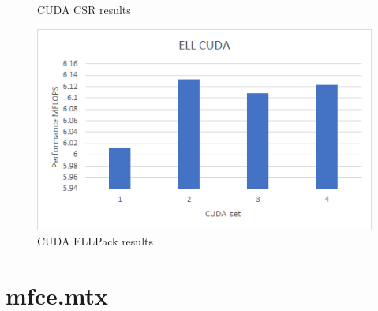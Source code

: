 \documentclass{scrreprt}
\begin{document}
\begin{figure}[ht]
\begin{minipage}[b]{0.5\linewidth}
    \caption{CUDA CSR results} 
    \vspace{4ex}
  \end{minipage}%
  \begin{minipage}[b]{0.5\linewidth}
    \centering
    \includegraphics[width=.9\linewidth]{mhda416ELLCUDA.png} 
    \caption{CUDA ELLPack  results} 
    \vspace{4ex}
  \end{minipage} 
\end{figure}
\FloatBarrier



\section{mfce.mtx}
\end{document}
